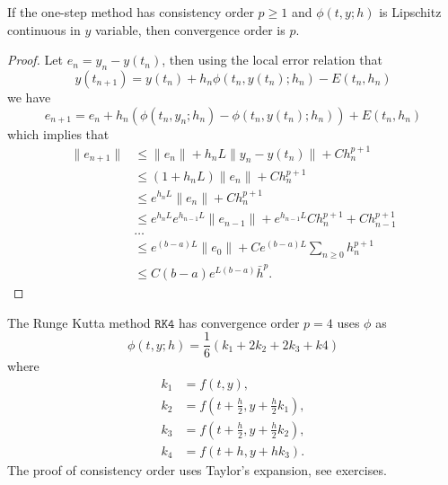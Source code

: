 \begin{theorem}
    If the one-step method has consistency order $p\ge 1$ and $\phi(t, y; h)$ is Lipschitz continuous in $y$ variable, then convergence order is $p$.
\end{theorem}
\begin{proof}
    Let $e_n = y_n - y(t_n)$, then using the local error relation that 
    \begin{equation}
        y(t_{n+1}) = y(t_n) + h_n \phi(t_n, y(t_n);h_n) - E(t_n, h_n)
    \end{equation}
    we have 
    \begin{equation}
        e_{n+1} = e_n + h_n (\phi(t_n, y_n; h_n) -\phi(t_n, y(t_n); h_n)) + E(t_n, h_n)
    \end{equation}
    which implies that 
    \begin{equation}
        \begin{aligned}
            \|e_{n+1}\|&\le \|e_n\| + h_n L\|y_n - y(t_n)\| + C h_n^{p+1} \\
            &\le (1 + h_n L)\|e_n\| + C h_n^{p+1} \\
            &\le e^{h_n L }\|e_n\| + C h_n^{p+1} \\
            &\le e^{h_n L }e^{h_{n-1} L }\|e_{n-1}\| + e^{h_{n-1} L }C h_n ^{p+1} + C h_{n-1}^{p+1} \\
            &\dots \\
            &\le e^{(b-a) L }\|e_0\| + C e^{(b-a) L } \sum_{n\ge 0} h_n^{p+1}\\
            &\le C(b-a) e^{L(b-a)} \bar{h}^p.
        \end{aligned}
    \end{equation}
\end{proof}

\begin{example}
    The Runge Kutta method $\texttt{RK4}$ has convergence order $p = 4$ uses $\phi$ as 
    \begin{equation}
        \phi(t, y;h) = \frac{1}{6}\left( k_1 + 2 k_2 + 2 k_3 + k4 \right)
    \end{equation}
    where 
    \begin{equation}
        \begin{aligned}
            k_1 &= f(t, y), \\ 
            k_2 &= f(t + \frac{h}{2}, y + \frac{h}{2}k_1),\\
            k_3 &= f(t + \frac{h}{2}, y+ \frac{h}{2}k_2), \\
            k_4&= f(t + h, y  + h k_3).
        \end{aligned}
    \end{equation}
    The proof of consistency order uses Taylor's expansion, see exercises.
\end{example}

